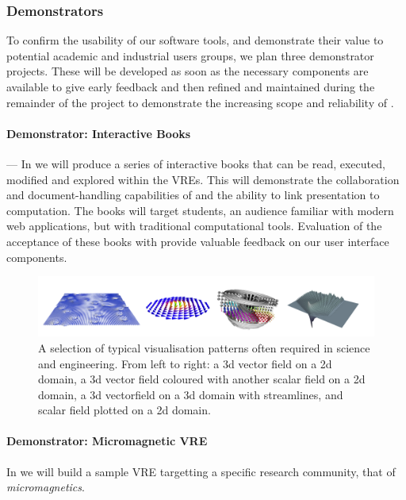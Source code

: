 \subsubsection{Demonstrators}



To confirm the usability of our software tools, and demonstrate their
value to potential academic and industrial users groups, we plan three
demonstrator projects. These will be developed as soon as the
necessary components are available to give early feedback and then
refined and maintained during the remainder of the project to
demonstrate the increasing scope and reliability of \TheProject.


\paragraph{Demonstrator: Interactive Books} ---
In   we will produce a series of interactive books
that can be read, executed, modified and explored within the
\TheProject VREs. This will demonstrate the collaboration and
document-handling capabilities of \TheProject and the ability to link
presentation to computation. The books will target students, an
audience familiar with modern web applications, but with traditional
computational tools. Evaluation of the acceptance of these books with
provide valuable feedback on our user interface components.

\begin{figure}
\includegraphics[width=1.0\textwidth]{Pictures/micromagnetic-and-3d-vis-4x1.pdf}
\caption{\label{fig:3d-plots} A selection of typical visualisation patterns often required in science and engineering. From left to right: a 3d vector field on a 2d domain, a 3d vector field coloured with another scalar field on a 2d domain, a 3d vectorfield on a 3d domain with streamlines, and scalar field plotted on a 2d domain.}
\end{figure}

\paragraph{Demonstrator: Micromagnetic VRE}
\label{sec:introduction-micromagnetic-vre-demonstrator} In
 we will build
a sample VRE targetting a specific research community, that of \textit{micromagnetics}.

